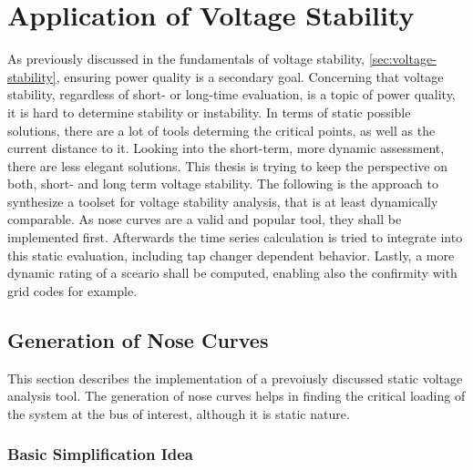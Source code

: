 \section{Application of Voltage Stability}
\label{sec:application-voltage-stability}


As previously discussed in the fundamentals of voltage stability, \autoref{sec:voltage-stability}, ensuring power quality is a secondary goal.
Concerning that voltage stability, regardless of short- or long-time evaluation, is a topic of power quality, it is hard to determine stability or instability.
In terms of static possible solutions, there are a lot of tools determing the critical points, as well as the current distance to it.
Looking into the short-term, more dynamic assessment, there are less elegant solutions. 
This thesis is trying to keep the perspective on both, short- and long term voltage stability.
The following is the approach to synthesize a toolset for voltage stability analysis, that is at least dynamically comparable.
As nose curves are a valid and popular tool, they shall be implemented first. 
Afterwards the time series calculation is tried to integrate into this static evaluation, including tap changer dependent behavior.
Lastly, a more dynamic rating of a sceario shall be computed, enabling also the confirmity with grid codes for example.

\subsection{Generation of Nose Curves}
\label{sec:nose-curves}


This section describes the implementation of a prevoiusly discussed static voltage analysis tool.
The generation of nose curves helps in finding the critical loading of the system at the bus of interest, although it is static nature. 

\subsubsection{Basic Simplification Idea}

